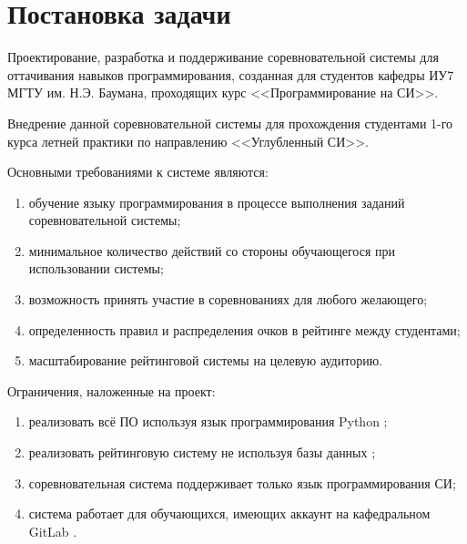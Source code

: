 \chapter*{Постановка задачи}

Проектирование, разработка и поддерживание соревновательной системы для оттачивания навыков программирования, созданная для студентов кафедры ИУ7 МГТУ им. Н.Э. Баумана, проходящих курс <<Программирование на СИ>>.

Внедрение данной соревновательной системы для прохождения студентами 1-го курса летней практики по направлению <<Углубленный СИ>>.

Основными требованиями к системе являются: 

\begin{enumerate}[label={\arabic*)}]
	\item обучение языку программирования в процессе выполнения заданий соревновательной системы;
	\item минимальное количество действий со стороны обучающегося при использовании системы;
	\item возможность принять участие в соревнованиях для любого желающего;
	\item определенность правил и распределения очков в рейтинге между студентами;
	\item масштабирование рейтинговой системы на целевую аудиторию.
\end{enumerate}

Ограничения, наложенные на проект: 

\begin{enumerate}[label={\arabic*)}]
	\item реализовать всё ПО используя язык программирования Python \cite{python};
	\item реализовать рейтинговую систему не используя базы данных \cite{db};
	\item соревновательная система поддерживает только язык программирования СИ;
	\item система работает для обучающихся, имеющих аккаунт на кафедральном GitLab \cite{gitlab}.
\end{enumerate}